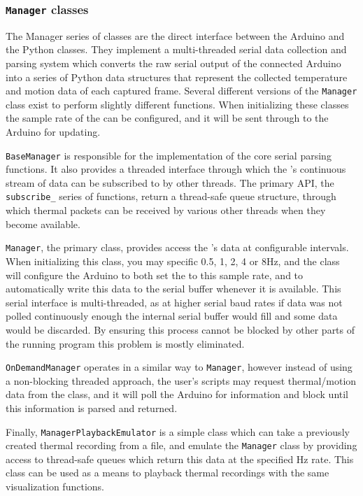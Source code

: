 \documentclass[../thesis/thesis.tex]{subfiles}
\begin{document}
\subsubsection*{\texttt{Manager} classes}
The Manager series of classes are the direct interface between the Arduino and the Python classes. They implement a multi-threaded serial data collection and parsing system which converts the raw serial output of the connected Arduino into a series of Python data structures that represent the collected temperature and motion data of each captured frame. Several different versions of the \texttt{Manager} class exist to perform slightly different functions. When initializing these classes the sample rate of the \mlx can be configured, and it will be sent through to the Arduino for updating.

\texttt{BaseManager} is responsible for the implementation of the core serial parsing functions. It also provides a threaded interface through which the \mlx's continuous stream of data can be subscribed to by other threads. The primary API, the \texttt{subscribe\_} series of functions, return a thread-safe queue structure, through which thermal packets can be received by various other threads when they become available.

\texttt{Manager}, the primary class, provides access the \mlx's data at configurable intervals. When initializing this class, you may specific 0.5, 1, 2, 4 or 8Hz, and the class will configure the Arduino to both set the \mlx to this sample rate, and to automatically write this data to the serial buffer whenever it is available. This serial interface is multi-threaded, as at higher serial baud rates if data was not polled continuously enough the internal serial buffer would fill and some data would be discarded. By ensuring this process cannot be blocked by other parts of the running program this problem is mostly eliminated. 

\texttt{OnDemandManager} operates in a similar way to \texttt{Manager}, however instead of using a non-blocking threaded approach, the user's scripts may request thermal/motion data from the class, and it will poll the Arduino for information and block until this information is parsed and returned.

Finally, \texttt{ManagerPlaybackEmulator} is a simple class which can take a previously created thermal recording from a file, and emulate the \texttt{Manager} class by providing access to thread-safe queues which return this data at the specified Hz rate. This class can be used as a means to playback thermal recordings with the same visualization functions.
\end{document}
